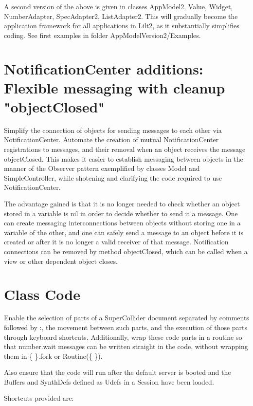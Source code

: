 \documentclass[11pt, a4paper]{scrartcl}
\begin{document}
A second version of the above is given in classes AppModel2, Value, Widget, NumberAdapter, SpecAdapter2, ListAdapter2. This will gradually become the application framework for all applications in Lilt2, as it substantially simplifies coding. See first examples in folder AppModelVersion2/Examples. 
\section*{NotificationCenter additions: Flexible messaging with cleanup "objectClosed"}
\label{sec-7}


Simplify the connection of objects for sending messages to each other via NotificationCenter. Automate the creation of mutual NotificationCenter registrations to messages, and their removal when an object receives the message objectClosed. This makes it easier to establish messaging between objects in the manner of the Observer pattern exemplified by classes Model and SimpleController, while shotening and clarifying the code required to use NotificationCenter.

The advantage gained is that it is no longer needed to check whether an object stored in a variable is nil in order to decide whether to send it a message. One can create messaging interconnections between objects without storing one in a variable of the other, and one can safely send a message to an object before it is created or after it is no longer a valid receiver of that message.  Notification connections can be removed by method objectClosed, which can be called when a view or other dependent object closes.
\section*{Class Code}
\label{sec-8}


Enable the selection of parts of a SuperCollider document separated by comments followed by :, the movement between such parts, and the execution of those parts through keyboard shortcuts. Additionally, wrap these code parts in a routine so that number.wait messages can be written straight in the code, without wrapping them in \{ \}.fork or Routine(\{ \}). 

Also ensure that the code will run after the default server is booted and the Buffers and SynthDefs defined as Udefs in a Session have been loaded. 

Shortcuts provided are:
\end{document}
